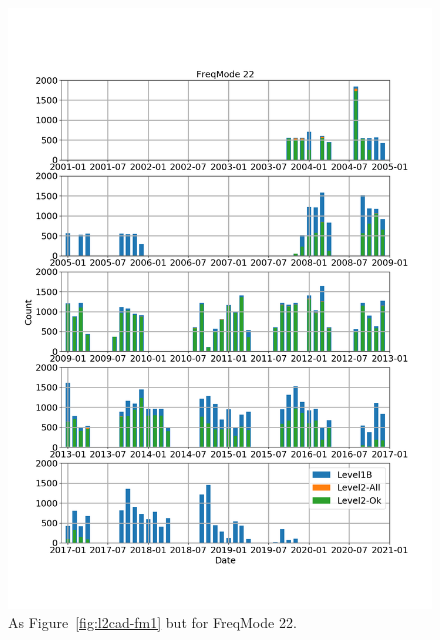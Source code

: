 \begin{figure}[t]
\centering
\includegraphics[width=1.0\textwidth]{l2cad-fm22.png}
\caption{As Figure~\ref{fig:l2cad-fm1} but for FreqMode 22.}
\label{fig:l2cad-fm22}
\end{figure}

